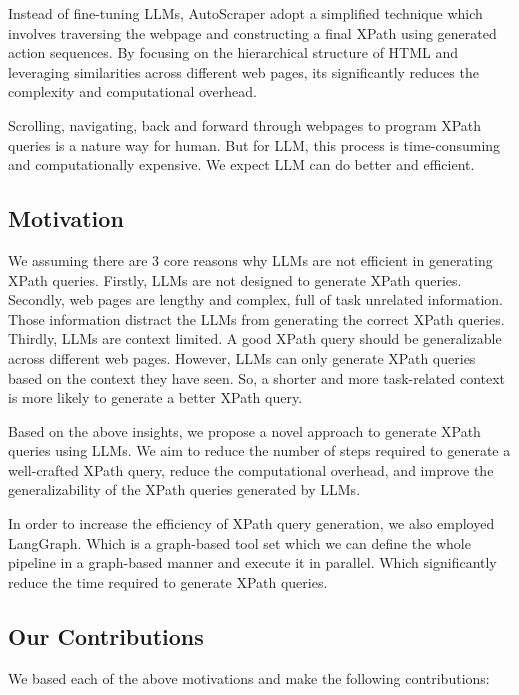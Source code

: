 \documentclass[a4paper]{article}
\begin{document}
Instead of fine-tuning LLMs, AutoScraper\cite{huang2024autoscraperprogressiveunderstandingweb} adopt a simplified technique which involves traversing the webpage and constructing a final XPath using generated action sequences. By focusing on the hierarchical structure of HTML and leveraging similarities across different web pages, its significantly reduces the complexity and computational overhead.

Scrolling, navigating, back and forward through webpages to program XPath queries is a nature way for human. But for LLM, this process is time-consuming and computationally expensive. We expect LLM can do better and efficient.

\subsection{Motivation}

We assuming there are 3 core reasons why LLMs are not efficient in generating XPath queries. Firstly, LLMs are not designed to generate XPath queries. Secondly, web pages are lengthy and complex, full of task unrelated information. Those information distract the LLMs from generating the correct XPath queries. Thirdly, LLMs are context limited. A good XPath query should be generalizable across different web pages. However, LLMs can only generate XPath queries based on the context they have seen. So, a shorter and more task-related context is more likely to generate a better XPath query.

Based on the above insights, we propose a novel approach to generate XPath queries using LLMs. We aim to reduce the number of steps required to generate a well-crafted XPath query, reduce the computational overhead, and improve the generalizability of the XPath queries generated by LLMs.

In order to increase the efficiency of XPath query generation, we also employed LangGraph. Which is a graph-based tool set which we can define the whole pipeline in a graph-based manner and execute it in parallel. Which significantly reduce the time required to generate XPath queries.

\subsection{Our Contributions}

We based each of the above motivations and make the following contributions:
\end{document}
